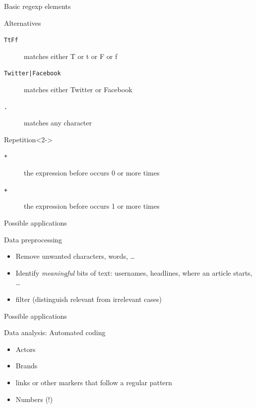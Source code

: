 \documentclass{beamer}
\begin{document}
\begin{frame}{Basic regexp elements}
\begin{block}{Alternatives}
\begin{description}
\item[{\tt{\lbrack TtFf\rbrack}}] matches either T or t or F or f
\item[{\tt{Twitter|Facebook}}] matches either Twitter or Facebook
\item[{\tt{.}}] matches any character
\end{description}
\end{block}
\begin{block}{Repetition}<2->
\begin{description}
\item[{\tt{*}}] the expression before occurs 0 or more times
\item[{\tt{+}}] the expression before occurs 1 or more times
\end{description}
\end{block}
\end{frame}




\begin{frame}{Possible applications}
\begin{block}{Data preprocessing}
\begin{itemize}
\item Remove unwanted characters, words, \ldots
\item Identify \emph{meaningful} bits of text: usernames, headlines, where an article starts, \ldots
\item filter (distinguish relevant from irrelevant cases)
\end{itemize}
\end{block}
\end{frame}


\begin{frame}{Possible applications}
\begin{block}{Data analysis: Automated coding}
\begin{itemize}
\item Actors
\item Brands
\item links or other markers that follow a regular pattern
\item Numbers (!)
\end{itemize}
\end{block}
\end{frame}
\end{document}
